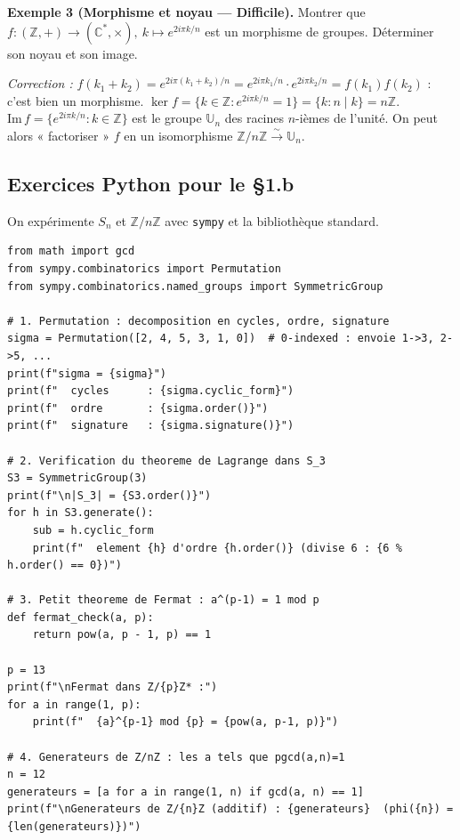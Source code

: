\documentclass[12pt,a4paper]{report}
\theoremstyle{definition}
\theoremstyle{remark}
\begin{document}
\medskip

\textbf{Exemple 3 (Morphisme et noyau --- Difficile).}
Montrer que $f : (\mathbb{Z}, +) \to (\mathbb{C}^*, \times),\ k \mapsto e^{2i\pi k/n}$ est un morphisme de groupes. Déterminer son noyau et son image.

\textit{Correction :} $f(k_1 + k_2) = e^{2i\pi(k_1 + k_2)/n} = e^{2i\pi k_1/n} \cdot e^{2i\pi k_2/n} = f(k_1) f(k_2)$ : c'est bien un morphisme.
$\ker f = \{k \in \mathbb{Z} : e^{2i\pi k/n} = 1\} = \{k : n \mid k\} = n\mathbb{Z}$.
$\mathrm{Im}\, f = \{e^{2i\pi k/n} : k \in \mathbb{Z}\}$ est le groupe $\mathbb{U}_n$ des racines $n$-ièmes de l'unité.
On peut alors « factoriser » $f$ en un isomorphisme $\mathbb{Z}/n\mathbb{Z} \xrightarrow{\sim} \mathbb{U}_n$.

\subsection{Exercices Python pour le §1.b}
On expérimente $S_n$ et $\mathbb{Z}/n\mathbb{Z}$ avec \texttt{sympy} et la bibliothèque standard.

\begin{lstlisting}
from math import gcd
from sympy.combinatorics import Permutation
from sympy.combinatorics.named_groups import SymmetricGroup

# 1. Permutation : decomposition en cycles, ordre, signature
sigma = Permutation([2, 4, 5, 3, 1, 0])  # 0-indexed : envoie 1->3, 2->5, ...
print(f"sigma = {sigma}")
print(f"  cycles      : {sigma.cyclic_form}")
print(f"  ordre       : {sigma.order()}")
print(f"  signature   : {sigma.signature()}")

# 2. Verification du theoreme de Lagrange dans S_3
S3 = SymmetricGroup(3)
print(f"\n|S_3| = {S3.order()}")
for h in S3.generate():
    sub = h.cyclic_form
    print(f"  element {h} d'ordre {h.order()} (divise 6 : {6 % h.order() == 0})")

# 3. Petit theoreme de Fermat : a^(p-1) = 1 mod p
def fermat_check(a, p):
    return pow(a, p - 1, p) == 1

p = 13
print(f"\nFermat dans Z/{p}Z* :")
for a in range(1, p):
    print(f"  {a}^{p-1} mod {p} = {pow(a, p-1, p)}")

# 4. Generateurs de Z/nZ : les a tels que pgcd(a,n)=1
n = 12
generateurs = [a for a in range(1, n) if gcd(a, n) == 1]
print(f"\nGenerateurs de Z/{n}Z (additif) : {generateurs}  (phi({n}) = {len(generateurs)})")
\end{lstlisting}
\end{document}
